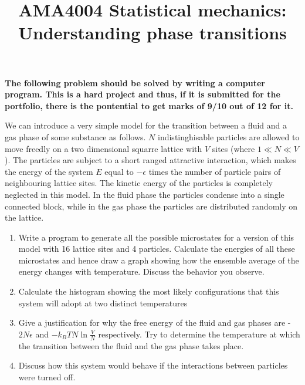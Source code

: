 \documentclass[a4paper]{article}
\title{
\vspace{-3em}
\begin{tcolorbox}
\Huge\sffamily AMA4004 Statistical mechanics: Understanding phase transitions
\end{tcolorbox}
\vspace{-3em}
}
\date{}
\begin{document}
\maketitle

{\bf The following problem should be solved by writing a computer program.  This is a hard project and thus, if it is submitted for the portfolio, there is the pontential to get marks of 9/10 out of 12 for it.}

\vpsace{1cm}

We can introduce a very simple model for the transition between a fluid and a gas phase of some substance as follows.  $N$ indistinghisable particles are
allowed to move freedly on a two dimensional squarre lattice with $V$ sites (where $1 \ll N \ll V$).  The particles are subject to a short ranged attractive
interaction, which makes the energy of the system $E$ equal to $-\epsilon$ times the number of particle pairs of neighbouring lattice sites.  The kinetic energy
of the particles is completely neglected in this model. In the fluid phase the particles condense into a single connected block, while in the gas phase the particles
are distributed randomly on the lattice.

\begin{enumerate}
\item Write a program to generate all the possible microstates for a version of this model with 16 lattice sites and 4 particles. Calculate the energies of all these microstates and hence draw a graph showing how the ensemble average of the energy changes with temperature. Discuss the behavior you observe. 
\item Calculate the histogram showing the most likely configurations that this system will adopt at two distinct temperatures 
\item Give a justification for why the free energy of the fluid and gas phases are -$2N\epsilon$ and $-k_B TN \ln \frac{V}{N}$ respectively.  Try to determine the temperature at which the transition between the fluid and the gas phase takes place. 
\item Discuss how this system would behave if the interactions between particles were turned off.  
\end{enumerate}
\end{document}
